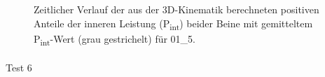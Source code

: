 \documentclass[
  letterpaper,
  DIV=11]{scrartcl}
\makeatletter
\let\oldparagraph\paragraph
\renewcommand{\paragraph}{
    \@ifstar
      \xxxParagraphStar
      \xxxParagraphNoStar
  }
\newcommand{\xxxParagraphStar}[1]{\oldparagraph*{#1}\mbox{}}
\newcommand{\xxxParagraphNoStar}[1]{\oldparagraph{#1}\mbox{}}
\makeatother
\begin{document}
\begin{figure}


\caption{\label{fig-PInt_Kinematik_01_5}Zeitlicher Verlauf der aus der
3D-Kinematik berechneten positiven Anteile der inneren Leistung
(P\textsubscript{int}) beider Beine mit gemitteltem
P\textsubscript{int}-Wert (grau gestrichelt) für 01\_5.}

\end{figure}%

\paragraph{Test 6}
\end{document}
